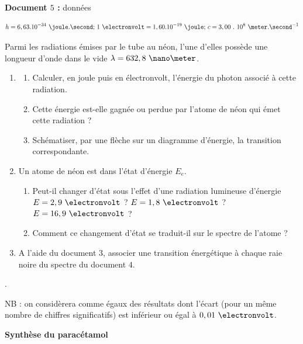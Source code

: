 \vspace{0.3cm}

\textbf{Document $5$ :} données

\vspace{0.3cm}

$$h=6,63 . 10^{-34}\text{ }\joule.\second\text{; }1\text{ }\electronvolt = 1,60 . 10^{-19}\text{ } \joule\text{; }c = 3,00\text{ }.\text{ }10^{8}\text{ } \meter.\second^{-1}$$

\vspace{0.3cm}

Parmi les radiations émises par le tube au néon, l'une d'elles possède une longueur d'onde dans le vide $\lambda = 632,8\text{ }\nano\meter$.

\begin{enumerate}
\item \begin{enumerate}[label=(\alph*)]
\item Calculer, en joule puis en électronvolt, l'énergie du photon associé à cette radiation.
\item Cette énergie est-elle gagnée ou perdue par l'atome de néon qui émet cette radiation ?
\item Schématiser, par une flèche sur un diagramme d'énergie, la transition correspondante.
\end{enumerate}
\item Un atome de néon est dans l'état d'énergie $E_{e}$.
\begin{enumerate}[label=(\alph*)]
\item Peut-il changer d'état sous l'effet d'une radiation lumineuse d'énergie $E = 2,9\text{ }\electronvolt$ ? $E = 1,8\text{ }\electronvolt$ ? $E = 16,9\text{ }\electronvolt$ ?
\item Comment ce changement d'état se traduit-il sur le spectre de l'atome ?
\end{enumerate}
\item A l'aide du document $3$, associer une transition énergétique à chaque raie noire du spectre du document $4$.
\end{enumerate}.

\newpage

NB : on considèrera comme égaux des résultats dont l'écart (pour un même nombre de chiffres significatifs) est inférieur ou égal à $0,01\text{ }\electronvolt$.

\vspace{0.3cm}

\exo \textbf{Synthèse du paracétamol}

